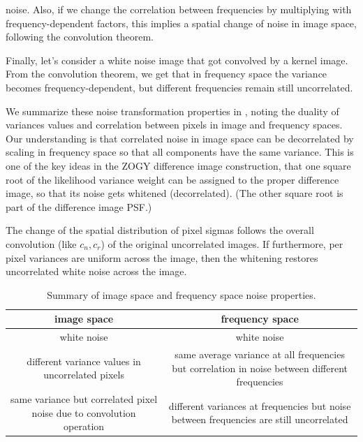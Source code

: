 noise. Also, if we change the correlation between frequencies by
multiplying with frequency-dependent factors, this implies a spatial
change of noise in image space, following the convolution
theorem.
%
\par Finally, let's consider a white noise image that got convolved by a kernel
image. From the convolution theorem, we get that in frequency space the
variance becomes frequency-dependent, but different frequencies remain still
uncorrelated.
%
\par We summarize these noise transformation properties in
, noting the duality of variances values and
correlation between pixels in image and frequency spaces. Our understanding
is that correlated noise in image space can be decorrelated by scaling in
frequency space so that all components have the same variance. This is one
of the key ideas in the ZOGY difference image construction, that one square
root of the likelihood variance weight can be assigned to the proper
difference image, so that its noise gets whitened (decorrelated). (The other
square root is part of the difference image PSF.)
%
\par The change of the spatial distribution of pixel sigmas follows the overall
convolution (like \(c_n, c_r\)) of the original uncorrelated images. If
furthermore, per pixel variances are uniform across the image, then the
whitening restores uncorrelated white noise across the image.
%
\begin{table}[h]
\begin{center}
\begin{tabular}{c|c}
  image space & frequency space \\
  \hline
  white noise & white noise \\
  \parbox{3in}{different variance values in uncorrelated pixels} &
  \parbox{3in}{same average variance at all frequencies
    but correlation in noise between different
    frequencies}
  \\
  \parbox{3in}{same variance but correlated pixel noise due to
  convolution operation} & \parbox{3in}{different variances at frequencies but
                 noise between frequencies are still uncorrelated} \\
\end{tabular}
\end{center}
\caption{\label{tab:freq_noise}Summary of image space and frequency space
  noise properties.}
\end{table}
%
